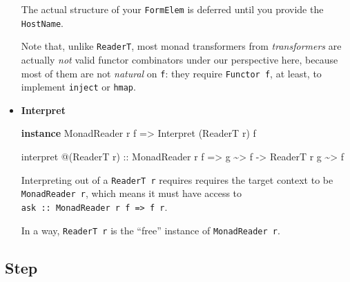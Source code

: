 \documentclass[]{article}
\newenvironment{Shaded}{}{}
\newcommand{\DataTypeTok}[1]{\textcolor[rgb]{0.56,0.13,0.00}{#1}}
\newcommand{\KeywordTok}[1]{\textcolor[rgb]{0.00,0.44,0.13}{\textbf{#1}}}
\newcommand{\NormalTok}[1]{#1}
\newcommand{\OperatorTok}[1]{\textcolor[rgb]{0.40,0.40,0.40}{#1}}
\newcommand{\OtherTok}[1]{\textcolor[rgb]{0.00,0.44,0.13}{#1}}
\begin{document}
\begin{itemize}
  The actual structure of your \texttt{FormElem} is deferred until you provide
  the \texttt{HostName}.

  Note that, unlike \texttt{ReaderT}, most monad transformers from
  \emph{transformers} are actually \emph{not} valid functor combinators under
  our perspective here, because most of them are not \emph{natural} on
  \texttt{f}: they require \texttt{Functor\ f}, at least, to implement
  \texttt{inject} or \texttt{hmap}.
\item
  \textbf{Interpret}

\begin{Shaded}
\begin{Highlighting}[]
\KeywordTok{instance} \DataTypeTok{MonadReader}\NormalTok{ r f }\OtherTok{=\textgreater{}} \DataTypeTok{Interpret}\NormalTok{ (}\DataTypeTok{ReaderT}\NormalTok{ r) f}

\NormalTok{interpret }\OperatorTok{@}\NormalTok{(}\DataTypeTok{ReaderT}\NormalTok{ r)}
\OtherTok{    ::} \DataTypeTok{MonadReader}\NormalTok{ r f}
    \OtherTok{=\textgreater{}}\NormalTok{ g }\OperatorTok{\textasciitilde{}\textgreater{}}\NormalTok{ f}
    \OtherTok{{-}\textgreater{}} \DataTypeTok{ReaderT}\NormalTok{ r g }\OperatorTok{\textasciitilde{}\textgreater{}}\NormalTok{ f}
\end{Highlighting}
\end{Shaded}

  Interpreting out of a \texttt{ReaderT\ r} requires requires the target context
  to be \texttt{MonadReader\ r}, which means it must have access to
  \texttt{ask\ ::\ MonadReader\ r\ f\ =\textgreater{}\ f\ r}.

  In a way, \texttt{ReaderT\ r} is the ``free'' instance of
  \texttt{MonadReader\ r}.
\end{itemize}

\subsection{Step}\label{step}
\end{document}
